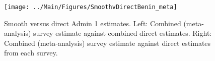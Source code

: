 \documentclass[12pt]{article}\usepackage[]{graphicx}\usepackage[]{color}
\newenvironment{knitrout}{}{} %
\begin{document}



\begin{knitrout}
\color{fgcolor}\begin{figure}[bht]

{\centering \texttt{[image: ../Main/Figures/SmoothvDirectBenin\_meta]} 

}

\caption[Smooth versus direct Admin 1 estimates]{Smooth versus direct Admin 1 estimates. Left: Combined (meta-analysis) survey estimate against combined direct estimates. Right: Combined (meta-analysis) survey estimate against direct estimates from each survey.}\label{fig:unnamed-chunk-13}
\end{figure}


\end{knitrout}
\end{document}
